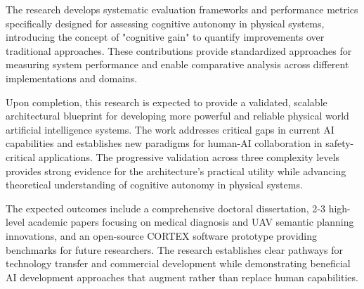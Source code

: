The research develops systematic evaluation frameworks and performance metrics specifically designed for assessing cognitive autonomy in physical systems, introducing the concept of "cognitive gain" to quantify improvements over traditional approaches. These contributions provide standardized approaches for measuring system performance and enable comparative analysis across different implementations and domains.

Upon completion, this research is expected to provide a validated, scalable architectural blueprint for developing more powerful and reliable physical world artificial intelligence systems. The work addresses critical gaps in current AI capabilities and establishes new paradigms for human-AI collaboration in safety-critical applications. The progressive validation across three complexity levels provides strong evidence for the architecture's practical utility while advancing theoretical understanding of cognitive autonomy in physical systems.

The expected outcomes include a comprehensive doctoral dissertation, 2-3 high-level academic papers focusing on medical diagnosis and UAV semantic planning innovations, and an open-source CORTEX software prototype providing benchmarks for future researchers. The research establishes clear pathways for technology transfer and commercial development while demonstrating beneficial AI development approaches that augment rather than replace human capabilities. 
